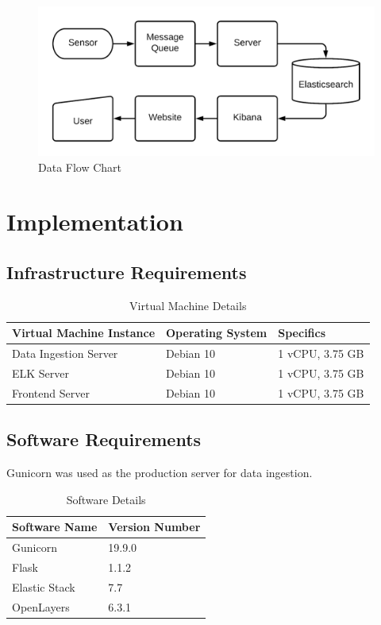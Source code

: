 \documentclass[]{report}
\begin{document}
\begin{figure}[ht]
  \includegraphics[width =\columnwidth]{dataflow.png}
  \caption{Data Flow Chart}
  \label{dataflow}
\end{figure}

\chapter{Implementation}

\section{Infrastructure Requirements}

\begin{table}[ht]
\label{hardware}
\begin{center}
\begin{tabular} {l|l|l} %
\hline
\hline
\textbf{Virtual Machine Instance} & \textbf{Operating System} & \textbf{Specifics}  \\
\hline
Data Ingestion Server & Debian 10 & 1 vCPU, 3.75 GB \\
ELK Server & Debian 10 & 1 vCPU, 3.75 GB \\
Frontend Server & Debian 10 & 1 vCPU, 3.75 GB \\
\hline 
\hline
\end{tabular}
\end{center}
\caption{Virtual Machine Details}
\end{table}


\section{Software Requirements}
Gunicorn was used as the production server for data ingestion.

\begin{table}[ht]
\label{software}
\begin{center}
\begin{tabular} {l|l} %
\hline
\hline
\textbf{Software Name} & \textbf{Version Number} \\
\hline
Gunicorn & 19.9.0 \\
Flask & 1.1.2 \\
Elastic Stack & 7.7 \\
OpenLayers & 6.3.1 \\
\hline 
\hline
\end{tabular}
\end{center}
\caption{Software Details}
\end{table}
\end{document}
